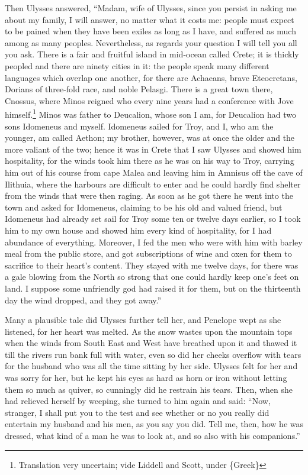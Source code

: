 Then Ulysses answered, “Madam, wife of Ulysses, since you persist in asking me
about my family, I will answer, no matter what it costs me: people must expect
to be pained when they have been exiles as long as I have, and suffered as much
among as many peoples. Nevertheless, as regards your question I will tell you
all you ask. There is a fair and fruitful island in mid-ocean called Crete; it
is thickly peopled and there are ninety cities in it: the people speak many
different languages which overlap one another, for there are Achaeans, brave
Eteocretans, Dorians of three-fold race, and noble Pelasgi. There is a great
town there, Cnossus, where Minos reigned who every nine years had a conference
with Jove himself.\footnote{Translation very uncertain; vide Liddell and Scott, under \{Greek\}} Minos was father to Deucalion,
whose son I am, for Deucalion had two sons Idomeneus and myself. Idomeneus
sailed for Troy, and I, who am the younger, am called Aethon; my brother,
however, was at once the older and the more valiant of the two; hence it was in
Crete that I saw Ulysses and showed him hospitality, for the winds took him
there as he was on his way to Troy, carrying him out of his course from cape
Malea and leaving him in Amnisus off the cave of Ilithuia, where the harbours
are difficult to enter and he could hardly find shelter from the winds that
were then raging. As soon as he got there he went into the town and asked for
Idomeneus, claiming to be his old and valued friend, but Idomeneus had already
set sail for Troy some ten or twelve days earlier, so I took him to my own
house and showed him every kind of hospitality, for I had abundance of
everything. Moreover, I fed the men who were with him with barley meal from the
public store, and got subscriptions of wine and oxen for them to sacrifice to
their heart’s content. They stayed with me twelve days, for there was a gale
blowing from the North so strong that one could hardly keep one’s feet on land.
I suppose some unfriendly god had raised it for them, but on the thirteenth day
the wind dropped, and they got away.”

Many a plausible tale did Ulysses further tell her, and Penelope wept as she
listened, for her heart was melted. As the snow wastes upon the mountain tops
when the winds from South East and West have breathed upon it and thawed it
till the rivers run bank full with water, even so did her cheeks overflow with
tears for the husband who was all the time sitting by her side. Ulysses felt
for her and was sorry for her, but he kept his eyes as hard as horn or iron
without letting them so much as quiver, so cunningly did he restrain his tears.
Then, when she had relieved herself by weeping, she turned to him again and
said: “Now, stranger, I shall put you to the test and see whether or no you
really did entertain my husband and his men, as you say you did. Tell me, then,
how he was dressed, what kind of a man he was to look at, and so also with his
companions.”

